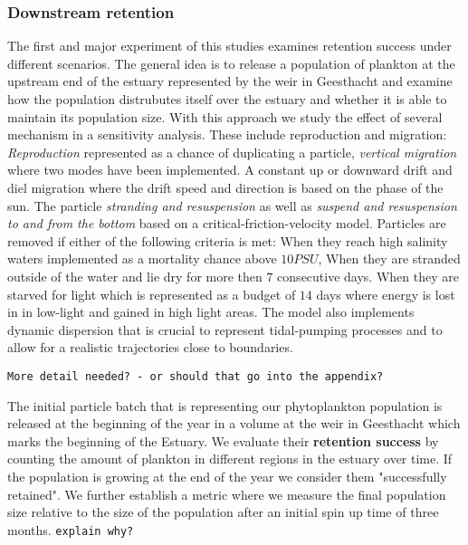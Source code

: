 \subsubsection*{Downstream retention}
The first and major experiment of this studies examines retention success under different scenarios.
The general idea is to release a population of plankton at the upstream end of the estuary represented by the weir in Geesthacht
and examine how the population distrubutes itself over the estuary and whether it is able to maintain its population size.
With this approach we study the effect of several mechanism in a sensitivity analysis. These include reproduction and migration:
\textit{Reproduction} represented as a chance of duplicating a particle,
\textit{vertical migration} where two modes have been implemented. 
A constant up or downward drift and diel migration where the drift speed and direction is based on the phase of the sun.
The particle \textit{stranding and resuspension} as well as \textit{suspend and resuspension to and from the bottom}
 based on a critical-friction-velocity model.
Particles are removed if either of the following criteria is met: 
When they reach high salinity waters implemented as a mortality chance above $10 PSU$,
When they are stranded outside of the water and lie dry for more then $7$ consecutive days.
When they are starved for light which is represented as a budget of $14$ days 
where energy is lost in in low-light and gained in high light areas.
The model also implements dynamic dispersion that is crucial to represent tidal-pumping processes 
and to allow for a realistic trajectories close to boundaries.

\smallskip
\texttt{More detail needed? - or should that go into the appendix?}
\smallskip

The initial particle batch that is representing our phytoplankton population is released at the beginning of the year in a volume at the weir in Geesthacht which marks the beginning of the Estuary.
We evaluate their \textbf{retention success} by counting the amount of plankton in different regions in the estuary over time.
If the population is growing at the end of the year we consider them "successfully retained".
We further establish a metric where we measure the final population size relative to the size of the population after an initial spin up time of three months.
\texttt{explain why?}

